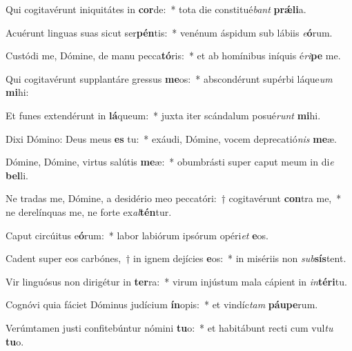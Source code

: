 \item Qui cogitavérunt iniquitátes in \textbf{cor}de:~* tota die constitué\textit{bant} \textbf{prǽ}\textbf{li}a.
\item Acuérunt linguas suas sicut ser\textbf{pén}tis:~* venénum áspidum sub lábiis \textit{e}\textbf{ó}rum.
\item Custódi me, Dómine, de manu pecca\textbf{tó}ris:~* et ab homínibus iníquis é\textit{ri}\textbf{pe} me.
\item Qui cogitavérunt supplantáre gressus \textbf{me}os:~* abscondérunt supérbi láque\textit{um} \textbf{mi}hi:
\item Et funes extendérunt in \textbf{lá}queum:~* juxta iter scándalum posué\textit{runt} \textbf{mi}hi.
\item Dixi Dómino: Deus meus \textbf{es} tu:~* exáudi, Dómine, vocem deprecatió\textit{nis} \textbf{me}æ.
\item Dómine, Dómine, virtus salútis \textbf{me}æ:~* obumbrásti super caput meum in di\textit{e} \textbf{bel}li.
\item Ne tradas me, Dómine, a desidério meo peccatóri:~† cogitavérunt \textbf{con}tra me,~* ne derelínquas me, ne forte ex\textit{al}\textbf{tén}tur.
\item Caput circúitus e\textbf{ó}rum:~* labor labiórum ipsórum opéri\textit{et} \textbf{e}os.
\item Cadent super eos carbónes,~† in ignem dejícies \textbf{e}os:~* in misériis non \textit{sub}\textbf{sís}tent.
\item Vir linguósus non dirigétur in \textbf{ter}ra:~* virum injústum mala cápient in \textit{in}\textbf{tér}\textbf{i}tu.
\item Cognóvi quia fáciet Dóminus judícium \textbf{ín}opis:~* et vindíc\textit{tam} \textbf{páu}\textbf{pe}rum.
\item Verúmtamen justi confitebúntur nómini \textbf{tu}o:~* et habitábunt recti cum vul\textit{tu} \textbf{tu}o.
